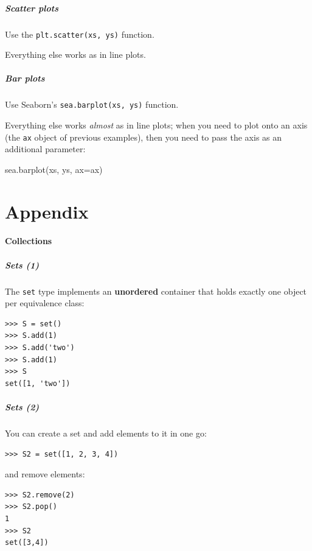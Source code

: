 \documentclass[english,serif,mathserif,xcolor=pdftex,dvipsnames,table]{beamer}
\begin{document}
\begin{frame}
  \frametitle{Scatter plots}

  Use the \texttt{plt.scatter(xs, ys)} function.

  \+
  Everything else works as in line plots.
\end{frame}


\begin{frame}[fragile]
  \frametitle{Bar plots}

  Use Seaborn's \texttt{sea.barplot(xs, ys)} function.

  \+
  Everything else works \emph{almost} as in line plots; when you need to plot
  onto an axis (the \texttt{ax} object of previous examples), then you need to
  pass the axis as an additional parameter:
\begin{semiverbatim}
sea.barplot(xs, ys, ax=ax)
\end{semiverbatim}
\end{frame}


\part{Appendix}

\subsection{Collections}


\begin{frame}[fragile]
  \frametitle{Sets (1)} The \texttt{set} type implements an
  \textbf{unordered} container that holds exactly one object per
  equivalence class:
\begin{lstlisting}
>>> S = set()
>>> S.add(1)
>>> S.add('two')
>>> S.add(1)
>>> S
set([1, 'two'])
\end{lstlisting}

\end{frame}


\begin{frame}[fragile]
  \frametitle{Sets (2)}
You can create a set and add elements to it in one go:
\begin{lstlisting}
>>> S2 = set([1, 2, 3, 4])
\end{lstlisting}

and remove elements:

\begin{lstlisting}
>>> S2.remove(2)
>>> S2.pop()
1
>>> S2
set([3,4])
\end{lstlisting}
\end{frame}
\end{document}
